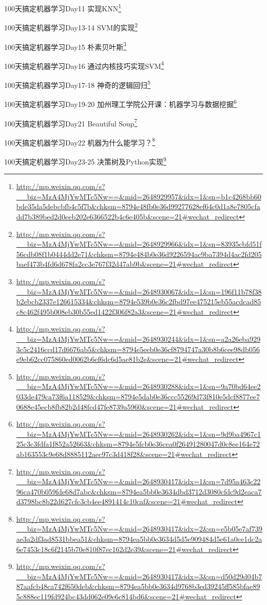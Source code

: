 \documentclass[]{ctexbook}
\renewcommand{\href}[2]{#2\footnote{\url{#1}}}
\begin{document}
\href{http://mp.weixin.qq.com/s?__biz=MzA4MjYwMTc5Nw==\&mid=2648929957\&idx=1\&sn=b1c4268bb60bde35da5debcbfb4c5f7b\&chksm=8794e48fb0e36d99277628ef64c0d1a8e7805cfadd7b389bed2d0eeb202e6366522b4c6e405b\&scene=21\#wechat_redirect}{100天搞定机器学习\textbar{}Day11 实现KNN}

\href{http://mp.weixin.qq.com/s?__biz=MzA4MjYwMTc5Nw==\&mid=2648929966\&idx=1\&sn=83935cbfd51f56cdb08f1b0444dd2e71\&chksm=8794e484b0e36d9226594ac9ba7394d4ac2fd205baef473b4fd6d678fa2cc3e767f32d47ab9b\&scene=21\#wechat_redirect}{100天搞定机器学习\textbar{}Day13-14 SVM的实现}

\href{http://mp.weixin.qq.com/s?__biz=MzA4MjYwMTc5Nw==\&mid=2648930067\&idx=1\&sn=196f11b78f38b2ebcb2337e126615334\&chksm=8794e539b0e36c2fbd97ee475215eb55acdcad85c8c462f495b008eb30b55ed1422f306f82a3\&scene=21\#wechat_redirect}{100天搞定机器学习\textbar{}Day15 朴素贝叶斯}

\href{http://mp.weixin.qq.com/s?__biz=MzA4MjYwMTc5Nw==\&mid=2648930244\&idx=1\&sn=a2a26eba9293c5c2416ccd17d6676ab5\&chksm=8794e5eeb0e36cf8794747a30b8b6cee98db056e9eb62cc075860ed0062b6ef6dc6d5ae81b2e\&scene=21\#wechat_redirect}{100天搞定机器学习\textbar{}Day16 通过内核技巧实现SVM}

\href{http://mp.weixin.qq.com/s?__biz=MzA4MjYwMTc5Nw==\&mid=2648930288\&idx=1\&sn=9a70bd64ee2033de479ca73f6a118529\&chksm=8794e5dab0e36ccc55269d73f810e5dcf8877ee70688e45ecb8fb82b2d48fcd47fe8739a5960\&scene=21\#wechat_redirect}{100天搞定机器学习\textbar{}Day17-18 神奇的逻辑回归}

\href{http://mp.weixin.qq.com/s?__biz=MzA4MjYwMTc5Nw==\&mid=2648930262\&idx=1\&sn=9d9ba4967c125c3c3fdfa1f852a52663\&chksm=8794e5fcb0e36cea0f26491280047d0c8ee164e72ab163553c9e68d8885112aec97c3d418f28\&scene=21\#wechat_redirect}{100天搞定机器学习\textbar{}Day19-20 加州理工学院公开课：机器学习与数据挖掘}

\href{http://mp.weixin.qq.com/s?__biz=MzA4MjYwMTc5Nw==\&mid=2648930417\&idx=1\&sn=7d95a463c2296ca470b059fde68d7abc\&chksm=8794ea5bb0e3634dbd3712d3080cfdc9d2eaca7d3798bc8b22d627cfc3cb4ee4891414c10caf\&scene=21\#wechat_redirect}{100天搞定机器学习\textbar{}Day21 Beautiful Soup}

\href{http://mp.weixin.qq.com/s?__biz=MzA4MjYwMTc5Nw==\&mid=2648930417\&idx=2\&sn=e5b05e7af739ae3a2df3ad8531bbea51\&chksm=8794ea5bb0e3634d5d5e909484d5e61a0ce1dc2a6e7453c18c6f2145b70e810f87ec162d2e39\&scene=21\#wechat_redirect}{100天搞定机器学习\textbar{}Day22 机器为什么能学习？}

\href{http://mp.weixin.qq.com/s?__biz=MzA4MjYwMTc5Nw==\&mid=2648930417\&idx=3\&sn=d50d29d04b787aafcb48ca742f650deb\&chksm=8794ea5bb0e3634d9768b3ed39245ff585bfae895c888ec119fd924bc43dd062e09e6c814bd6\&scene=21\#wechat_redirect}{100天搞定机器学习\textbar{}Day23-25 决策树及Python实现}
\end{document}
